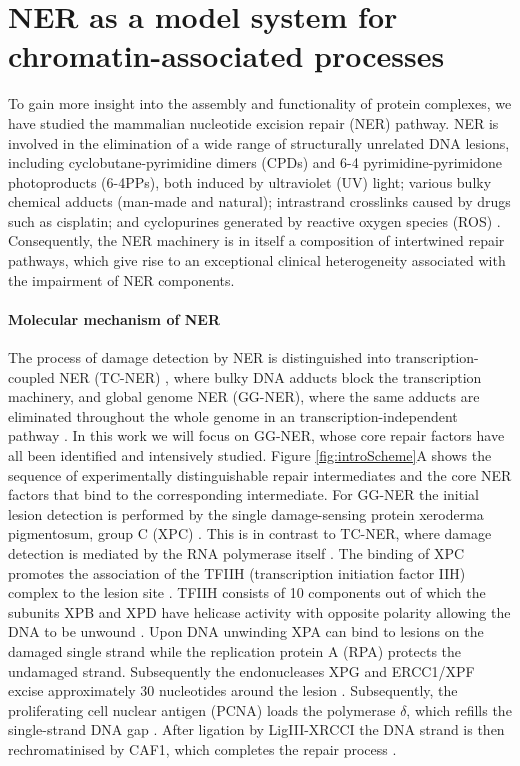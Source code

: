 \section{NER as a model system for chromatin-associated processes}
\label{sec:NERexperiments}
To gain more insight into the assembly and functionality of protein complexes, we have studied the mammalian nucleotide excision repair (NER) pathway. NER is involved in the elimination of a wide range of structurally unrelated DNA lesions, including cyclobutane-pyrimidine dimers (CPDs) and 6-4 pyrimidine-pyrimidone photoproducts (6-4PPs), both induced by ultraviolet (UV) light; various bulky chemical adducts (man-made and natural); intrastrand crosslinks caused by drugs such as cisplatin; and cyclopurines generated by reactive oxygen species (ROS) \cite{Marteijn2014}. Consequently, the NER machinery is in itself a composition of intertwined repair pathways, which give rise to an exceptional clinical heterogeneity associated with the impairment of NER components. 


\paragraph{Molecular mechanism of NER}
The process of damage detection by NER is distinguished into transcription-coupled NER (TC-NER) \cite{Sugasawa:2005:Cell:15882621,Gillet:2006:Chem-Rev:16464005}, where bulky DNA adducts block the transcription machinery, and global genome NER (GG-NER), where the same adducts are eliminated throughout the whole genome in an transcription-independent pathway \cite{Fousteri2008}. In this work we will focus on GG-NER, whose core repair factors have all been identified and intensively studied. Figure \ref{fig:introScheme}A shows the sequence of experimentally distinguishable repair intermediates and the core NER factors that bind to the corresponding intermediate. For GG-NER the initial lesion detection is performed by the single damage-sensing protein xeroderma pigmentosum, group C (XPC) \cite{Sugasawa:1998:Mol-Cell:9734359,Volker2001}. This is in contrast to TC-NER, where damage detection is mediated by the RNA polymerase itself \cite{Hanawalt2008}. The binding of XPC promotes the association of the TFIIH (transcription initiation factor IIH) complex to the lesion site \cite{Yokoi:2000:J-Biol-Chem:10734143,Riedl2003,Volker2001}. TFIIH consists of 10 components out of which the subunits XPB and XPD have helicase activity with opposite polarity allowing the DNA to be unwound \cite{Tapias2004,Compe2012}. Upon DNA unwinding XPA can bind to lesions on the damaged single strand while the replication protein A (RPA) protects the undamaged strand. Subsequently the endonucleases XPG and ERCC1/XPF excise approximately 30 nucleotides around the lesion \cite{Evans1997,deLaat:1998:Genes-Dev:9716411,Wakasugi:1997:J-Biol-Chem:9188507,Park:2006:FEBS-J:16623697,Camenisch:2006:Nat-Struct-Mol-Biol:16491090}. Subsequently, the proliferating cell nuclear antigen (PCNA) loads the polymerase $\delta$, which refills the single-strand DNA gap \cite{Hoeijmakers:2001:Nature:11357144,Essers2005,Moser:2007:Mol-Cell:17643379}. After ligation by LigIII-XRCCI the DNA strand is then rechromatinised by CAF1, which completes the repair process \cite{Green:2003:EMBO-J:14517254,Polo2006} . 

